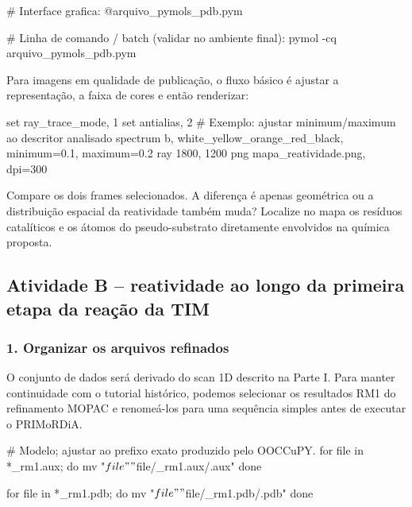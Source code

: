 \documentclass[a4paper,11pt]{refart}
\begin{document}
\begin{pymol}
# Interface grafica:
@arquivo_pymols_pdb.pym

# Linha de comando / batch (validar no ambiente final):
pymol -cq arquivo_pymols_pdb.pym
\end{pymol}

Para imagens em qualidade de publicação, o fluxo básico é ajustar a representação, a faixa de cores e então renderizar:

\begin{pymol}
set ray_trace_mode, 1
set antialias, 2
# Exemplo: ajustar minimum/maximum ao descritor analisado
spectrum b, white_yellow_orange_red_black, minimum=0.1, maximum=0.2
ray 1800, 1200
png mapa_reatividade.png, dpi=300
\end{pymol}

\begin{interpretacaobox}
Compare os dois frames selecionados. A diferença é apenas geométrica ou a distribuição espacial da reatividade também muda? Localize no mapa os resíduos catalíticos e os átomos do pseudo-substrato diretamente envolvidos na química proposta.
\end{interpretacaobox}

\subsection{Atividade B -- reatividade ao longo da primeira etapa da reação da TIM}

\subsubsection{1. Organizar os arquivos refinados}

O conjunto de dados será derivado do scan 1D descrito na Parte I. Para manter continuidade com o tutorial histórico, podemos selecionar os resultados RM1 do refinamento MOPAC e renomeá-los para uma sequência simples antes de executar o PRIMoRDiA.

\begin{shell}
# Modelo; ajustar ao prefixo exato produzido pelo OOCCuPY.
for file in *_rm1.aux; do
    mv "$file" "${file/_rm1.aux/.aux}"
done

for file in *_rm1.pdb; do
    mv "$file" "${file/_rm1.pdb/.pdb}"
done
\end{shell}
\end{document}
